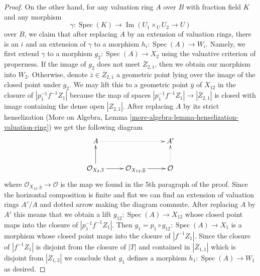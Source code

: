 \documentclass{stacks-project}
\theoremstyle{plain}
\theoremstyle{definition}
\theoremstyle{remark}
\numberwithin{equation}{subsection}
\def\Spec{\mathop{\mathrm{Spec}}}
\def\Im{\mathop{\mathrm{Im}}}
\begin{document}
\begin{proof}
\medskip\noindent
On the other hand, for any valuation ring $A$ over $B$ with
fraction field $K$ and any morphism
$$
\gamma : \Spec(K) \to \Im(U_1 \times_U U_2 \to U)
$$
over $B$, we claim that after replacing $A$ by an extension of valuation
rings, there is an $i$ and an extension of $\gamma$ to a morphism
$h_i : \Spec(A) \to W_i$. Namely, we first extend $\gamma$ to a
morphism $g_2 : \Spec(A) \to X_2$ using the valuative criterion of
properness. If the image of $g_2$ does not meet $\overline{Z}_{2, 1}$,
then we obtain our morphism into $W_2$.
Otherwise, denote $\overline{z} \in \overline{Z}_{2, 1}$ a geometric
point lying over the image of the closed point under $g_2$.
We may lift this to a geometric point $\overline{y}$ of $X_{12}$
in the closure of $|p_1^{-1}f^{-1}Z_1|$ because the map of
spaces $|p_1^{-1}f^{-1}Z_1| \to |\overline{Z}_{2, 1}|$ is closed
with image containing the dense open $|Z_{2, 1}|$. After replacing $A$
by its strict henselization
(More on Algebra, Lemma \ref{more-algebra-lemma-henselization-valuation-ring})
we get the following diagram
$$
\xymatrix{
A \ar@{..>}[rr] & & A' \\
\mathcal{O}_{X_2, \overline{z}} \ar[r] \ar[u] &
\mathcal{O}_{X_{12}, \overline{y}} \ar[r] &
\mathcal{O} \ar@{..>}[u]
}
$$
where $\mathcal{O}_{X_{12}, \overline{y}} \to \mathcal{O}$ is the
map we found in the 5th paragraph of the proof.
Since the horizontal composition is finite and flat we can find an
extension of valuation rings $A'/A$ and dotted arrow making the diagram
commute. After replacing $A$ by $A'$ this means that we obtain a lift
$g_{12} : \Spec(A) \to X_{12}$ whose closed point maps into
the closure of $|p_1^{-1}f^{-1}Z_1|$.
Then $g_1 = p_1 \circ g_{12} : \Spec(A) \to X_1$ is a morphism whose
closed point maps into the closure of $|f^{-1}Z_1|$. Since the closure
of $|f^{-1}Z_1|$ is disjoint from the closure of $|T|$ and contained in
$|\overline{Z}_{1, 1}|$ which is disjoint from $|\overline{Z}_{1, 2}|$
we conclude that $g_1$ defines a morphism $h_1 : \Spec(A) \to W_1$
as desired.


\end{proof}
\end{document}
